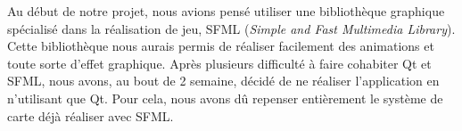 Au début de notre projet, nous avions pensé utiliser une bibliothèque graphique spécialisé dans la réalisation de jeu, SFML (\textit{Simple and Fast Multimedia Library}).\\
Cette bibliothèque nous aurais permis de réaliser facilement des animations et toute sorte d'effet graphique.
Après plusieurs difficulté à faire cohabiter Qt et SFML,
nous avons, au bout de 2 semaine, décidé de ne réaliser l'application en n'utilisant que Qt.
Pour cela, nous avons dû repenser entièrement le système de carte déjà réaliser avec SFML.
